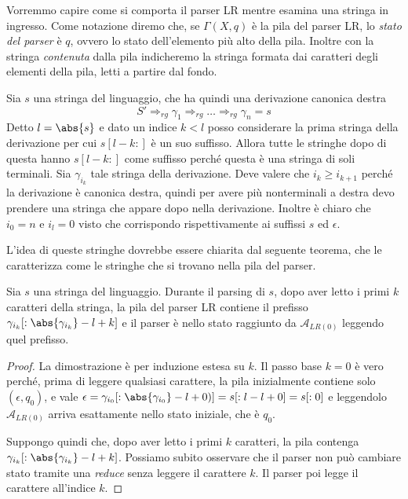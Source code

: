 \documentclass[12pt]{article}
\numberwithin{theorem}{subsection}
\begin{document}
Vorremmo capire come si comporta il parser LR mentre esamina una stringa in ingresso. Come notazione diremo che, se $\Gamma (X, q)$ è la pila del parser LR, lo \textit{stato del parser} è $q$, ovvero lo stato dell'elemento più alto della pila. Inoltre con la stringa \textit{contenuta} dalla pila indicheremo la stringa formata dai caratteri degli elementi della pila, letti a partire dal fondo.

Sia $s$ una stringa del linguaggio, che ha quindi una derivazione canonica destra
\[
S' \Rightarrow_{rg} \gamma_1 \Rightarrow_{rg} \dots \Rightarrow_{rg} \gamma_n = s
\]
Detto $l = \abs{s}$ e dato un indice $k < l$ posso considerare la prima stringa della derivazione per cui $s[l - k:]$ è un suo suffisso. Allora tutte le stringhe dopo di questa hanno $s[l - k:]$ come suffisso perché questa è una stringa di soli terminali. Sia $\gamma_{i_k}$ tale stringa della derivazione.
Deve valere che $i_k \ge i_{k+1}$ perché la derivazione è canonica destra, quindi per avere più nonterminali a destra devo prendere una stringa che appare dopo nella derivazione. Inoltre è chiaro che $i_0 = n$ e $i_l = 0$ visto che corrispondo rispettivamente ai suffissi $s$ ed $\epsilon$.

L'idea di queste stringhe dovrebbe essere chiarita dal seguente teorema, che le caratterizza come le stringhe che si trovano nella pila del parser.

\begin{lemma}\label{th:parser-viable-prefix}
	Sia $s$ una stringa del linguaggio. Durante il parsing di $s$, dopo aver letto i primi $k$ caratteri della stringa, la pila del parser LR contiene il prefisso $\gamma_{i_k}[:\abs{\gamma_{i_k}} - l + k]$ e il parser è nello stato raggiunto da $\mathcal{A}_{LR(0)}$ leggendo quel prefisso.
\end{lemma}
\begin{proof}
	La dimostrazione è per induzione estesa su $k$.
	Il passo base $k = 0$ è vero perché, prima di leggere qualsiasi carattere, la pila inizialmente contiene solo $(\epsilon, q_0)$, e vale $\epsilon = \gamma_{i_0}[:\abs{\gamma_{i_0}} - l + 0)] = s[:l - l + 0] = s[:0]$ e leggendolo $\mathcal{A}_{LR(0)}$ arriva esattamente nello stato iniziale, che è $q_0$.
	
	Suppongo quindi che, dopo aver letto i primi $k$ caratteri, la pila contenga $\gamma_{i_k}[:\abs{\gamma_{i_k}} - l + k]$. Possiamo subito osservare che il parser non può cambiare stato tramite una \textit{reduce} senza leggere il carattere $k$.
	Il parser poi legge il carattere all'indice $k$. 
\end{proof}
\end{document}

